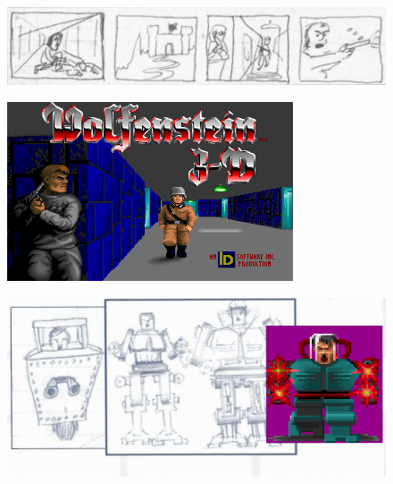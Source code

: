 \documentclass[book.tex]{subfiles}
\begin{document}
\noindent
   \begin{figure}[H]
\centering
 \includegraphics[width=\textwidth]{imgs/tom_hall_sketch_intro_screen_genesis.png}
 \end{figure}
 \par
   \begin{figure}[H]
\centering
 \includegraphics[width=.7\textwidth]{imgs/sprites/woldf3d.png}
\end{figure} 



\begin{figure}[H]
\centering    
     \includegraphics[width=\textwidth]{imgs/tom_hall_sketch_adolf.png}
   \end{figure}
\end{document}
